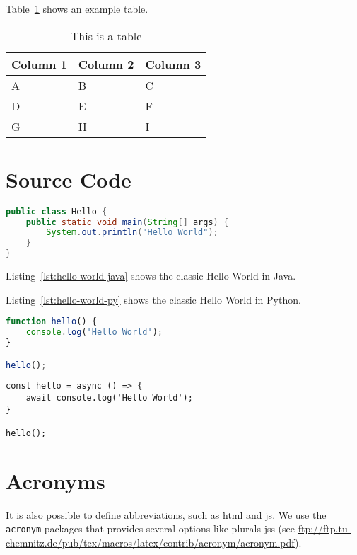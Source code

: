 Table~\ref{tab:table-one} shows an example table.

\begin{table}[htbp]
    \centering
    \caption{This is a table}
    \label{tab:table-one}
    \begin{tabular}{lll}
        \addlinespace
        \toprule
        Column 1 & Column 2 & Column 3 \\
        \midrule
        A     & B     & C \\
        D     & E     & F \\
        G     & H     & I \\
        \bottomrule
    \end{tabular}
\end{table}

\section{Source Code}

\begin{lstlisting}[language=Java, caption=Hello World in Java, label=lst:hello-world-java]
public class Hello {
    public static void main(String[] args) {
        System.out.println("Hello World");
    }
}
\end{lstlisting}

Listing~\ref{lst:hello-world-java} shows the classic Hello World in Java.



Listing~\ref{lst:hello-world-py} shows the classic Hello World in Python.

\begin{lstlisting}[language=JavaScript, caption=Hello World in JavaScript, label=lst:hello-world-javascript]
function hello() {
    console.log('Hello World');
}

hello();
\end{lstlisting}

\newpage
\begin{lstlisting}[language=ES6, caption=Hello World in JavaScript (ES6), label=lst:hello-world-javascript]
const hello = async () => {
    await console.log('Hello World');
}

hello();
\end{lstlisting}

\section{Acronyms}
It is also possible to define abbreviations, such as \ac{html} and \ac{js}. We use the \texttt{acronym} packages that provides several options like plurals \acp{js} (see \url{ftp://ftp.tu-chemnitz.de/pub/tex/macros/latex/contrib/acronym/acronym.pdf}).

